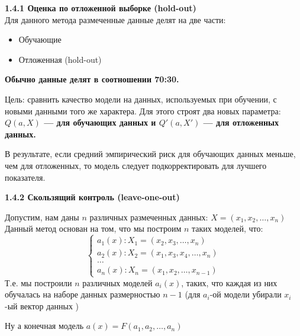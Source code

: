 \textbf{1.4.1 Оценка по отложенной выборке (hold-out)} \\
\vspace{0.5cm}
Для данного метода размеченные данные делят на две части: \\
\vspace{0.2cm}
\begin{itemize}
    \item Обучающие
    \item Отложенная (hold-out)
\end{itemize}
\textbf{Обычно данные делят в соотношении 70:30.}

Цель: сравнить качество модели на данных, используемых при обучении, с новыми данными того же характера.
Для этого строят два новых параметра: \textbf{\(Q(a, X)\) — для обучающих данных и \(Q'(a, X')\) — для отложенных данных.} \\
\vspace{0.3cm}

В результате, если средний эмпирический риск для обучающих данных меньше, чем для отложенных,
то модель следует подкорректировать для лучшего показателя. \\
\vspace{0.5cm}

\textbf{1.4.2 Скользящий контроль (leave-one-out)} \\
\vspace{0.5cm}

Допустим, нам даны \(n\) различных размеченных данных: \(X = (x_1, x_2, \ldots, x_n)\) \\
Данный метод основан на том, что мы построим \(n\) таких моделей, что: \\
\vspace{0.3cm}
\[
\begin{cases}
    a_1(x): X_1 = (x_2, x_3, \ldots, x_n) \\
    a_2(x): X_2 = (x_1, x_3, x_4, \ldots, x_n) \\
    \ldots \\
    a_n(x): X_n = (x_1, x_2, \ldots, x_{n-1})
\end{cases}
\]
\vspace{0.2cm}
Т.е. мы построили \(n\) различных моделей \(a_i(x)\), таких, что каждая из них обучалась на наборе
данных размерностью \(n-1\) (для \(a_i\)-ой модели убирали \(x_i\)-ый вектор данных )\\
\vspace{0.3cm}

Ну а конечная модель \(a(x) = F(a_1, a_2, \ldots, a_n)\) \\
\vspace{0.3cm}

